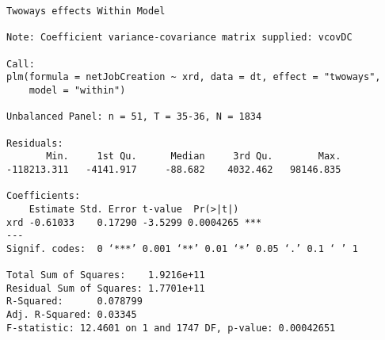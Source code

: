 \documentclass[11pt]{article}
\begin{document}
    
    \begin{verbatim}
Twoways effects Within Model

Note: Coefficient variance-covariance matrix supplied: vcovDC

Call:
plm(formula = netJobCreation ~ xrd, data = dt, effect = "twoways", 
    model = "within")

Unbalanced Panel: n = 51, T = 35-36, N = 1834

Residuals:
       Min.     1st Qu.      Median     3rd Qu.        Max. 
-118213.311   -4141.917     -88.682    4032.462   98146.835 

Coefficients:
    Estimate Std. Error t-value  Pr(>|t|)    
xrd -0.61033    0.17290 -3.5299 0.0004265 ***
---
Signif. codes:  0 ‘***’ 0.001 ‘**’ 0.01 ‘*’ 0.05 ‘.’ 0.1 ‘ ’ 1

Total Sum of Squares:    1.9216e+11
Residual Sum of Squares: 1.7701e+11
R-Squared:      0.078799
Adj. R-Squared: 0.03345
F-statistic: 12.4601 on 1 and 1747 DF, p-value: 0.00042651
    \end{verbatim}
\end{document}
